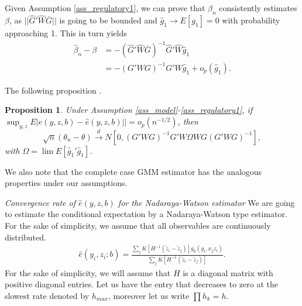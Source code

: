 \documentclass{article}
\newtheorem{proposition}{Proposition}
\theoremstyle{definition}
\theoremstyle{remark}
\begin{document}
Given Assumption \ref{ass_regulatory1}, we can prove that $\hat{\beta}_n$ consistently estimates $\beta$, as $||\hat{G}'\hat{W}\bar{G}||$ is going to be bounded and $\hat{g}_1 \rightarrow E[g_1]=0$ with probability approaching 1. This in turn yields
\begin{align}
    \hat{\beta}_n -\beta&=-(\hat{G}'\hat{W}\bar{G})^{-1} \hat{G}'\hat{W} \hat{g}_1 \\
    &= -(G'WG)^{-1}G'W \hat{g}_1 + o_p(\hat{g}_1).\nonumber
\end{align}

The following proposition .
\begin{proposition}\label{prop_asympTheory}
	Under Assumption \ref{ass_model}-\ref{ass_regulatory1}, if $\sup_{y,z}E|e(y, z,b)-\hat{e}(y,z,b)||=o_p(n^{-1/2})$, then
	\[\sqrt{n}(\theta_n-\theta) \stackrel{d}{\rightarrow} N[0, (G'WG)^{-1}G'W \Omega W G (G'WG)^{-1}],
	\]
	with $\Omega= \lim E[\hat{g}_1'\hat{g}_1]$.
\end{proposition}
We also note that the complete case GMM estimator has the analogous properties under our assumptions.

\emph{Convergence rate of $\hat{e}(y,z,b)$ for the Nadaraya-Watson estimator}
We are going to estimate the conditional expectation by a Nadaraya-Watson type estimator. For the sake of simplicity, we assume that all observables are continuously distributed. 
\begin{align}
    \hat{e}(y_i, z_i; b)= \frac{\sum_j K[H^{-1}(\tilde{z}_i-\tilde{z}_j)] g_0(y_i, x_j z_i)}{\sum_j K[H^{-1}(\tilde{z}_i-\tilde{z}_j)]}.
\end{align}
For the sake of simplicity, we will assume that $H$ is a diagonal matrix with positive diagonal entries. Let us have the entry that decreases to zero at the slowest rate denoted by $h_{max}$, moreover let us write $\prod h_k= h$.
\end{document}
